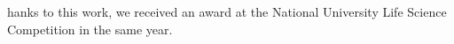 hanks to this work, we received an award at the National University Life Science Competition in the same year.